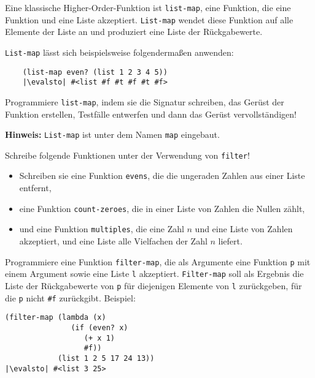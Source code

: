 \begin{aufgabe}
  Eine klassische Higher-Order-Funktion ist \texttt{list-map}, eine Funktion, die 
  eine Funktion und eine Liste akzeptiert.  \texttt{List-map}
  wendet diese Funktion auf alle Elemente der Liste an und produziert
  eine Liste der Rückgabewerte.

  \texttt{List-map} lässt sich beispielsweise folgendermaßen anwenden:
  \begin{lstlisting}
    (list-map even? (list 1 2 3 4 5))
    |\evalsto| #<list #f #t #f #t #f>
  \end{lstlisting}
  Programmiere \texttt{list-map}, indem sie die Signatur schreiben,
  das Gerüst der Funktion erstellen, Testfälle entwerfen und dann das
  Gerüst vervollständigen!

  \textbf{Hinweis:} \texttt{List-map} ist unter dem Namen \texttt{map} eingebaut.
\end{aufgabe}

\begin{aufgabe}
  Schreibe folgende Funktionen unter der  
  Verwendung von \texttt{filter}!
  \begin{itemize}
    \item Schreiben sie eine Funktion \texttt{evens}, die die ungeraden Zahlen aus 
      einer Liste entfernt,
  \item eine Funktion \texttt{count-zeroes}, die in einer Liste von
    Zahlen die Nullen zählt,
  \item und eine Funktion \texttt{multiples}, die eine Zahl $n$ und
    eine Liste von Zahlen akzeptiert, und eine Liste alle Vielfachen
    der Zahl $n$ liefert.
  \end{itemize}
\end{aufgabe}

\begin{aufgabe}
  Programmiere eine Funktion
  \texttt{filter-map}, die als Argumente eine Funktion \texttt{p} mit
  einem Argument sowie eine Liste \texttt{l} akzeptiert.
  \texttt{Filter-map} soll als Ergebnis die Liste der Rückgabewerte
  von \texttt{p} für diejenigen Elemente von \texttt{l} zurückgeben,
  für die \texttt{p} nicht \texttt{\#f} zurückgibt. Beispiel:

\begin{lstlisting}
(filter-map (lambda (x)
               (if (even? x)
                  (+ x 1)
                  #f))
            (list 1 2 5 17 24 13))
|\evalsto| #<list 3 25>
\end{lstlisting}
\end{aufgabe}

